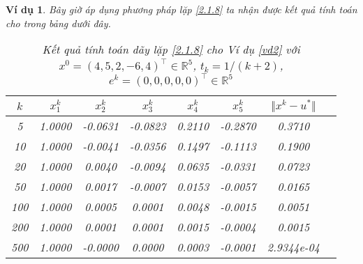 \documentclass[14pt, oneside,A4paper]{book}
\theoremstyle{plain}
\newtheorem{vd}[theorem]{\bf Ví dụ}
\begin{document}
\begin{vd}
Bây giờ áp dụng phương pháp lặp \eqref{2.1.8} ta nhận được kết quả tính toán cho trong bảng dưới đây.

\begin{table}[ht!]
	\centering			
\begin{tabular}{|c|c|c|c|c|c|c|c|}
\hline 
$k$ & $x_1^k$ & $x_2^k$ & $x_3^k$ & $x_4^k$ & $x_5^k$ & $\Vert x^ {k}- u^{*} \Vert$ \\ 
\hline 
5 & 1.0000 & -0.0631 & -0.0823 & 0.2110 & -0.2870 & 0.3710 \\ 
\hline 
10 & 1.0000 & -0.0041 & -0.0356 & 0.1497 & -0.1113 & 0.1900 \\ 
\hline 
20 & 1.0000 & 0.0040 & -0.0094 & 0.0635 & -0.0331 & 0.0723 \\
\hline 
50 & 1.0000 & 0.0017 & -0.0007 & 0.0153 & -0.0057 & 0.0165 \\
\hline
100 & 1.0000 & 0.0005 & 0.0001 & 0.0048 & -0.0015 & 0.0051 \\
\hline
200 & 1.0000 & 0.0001 & 0.0001 & 0.0015 & -0.0004 & 0.0015 \\
\hline
500 & 1.0000 & -0.0000 & 0.0000 & 0.0003 & -0.0001 & 2.9344e-04 \\
\hline
\end{tabular}
\caption{Kết quả tính toán dãy lặp \eqref{2.1.8} cho Ví dụ \ref{vd2} với $x^0= (4,5,2,-6,4)^\top \in \mathbb R^5 $,  $t_k = 1/(k+2)$, $e^{k}=(0,0,0,0,0)^\top \in \mathbb R^5$}
\label{B26}
\end{table}




\end{vd}
\end{document}
